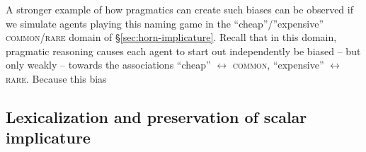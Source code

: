 \documentclass{article} %
\begin{document}
A stronger example of how pragmatics can create such biases can be observed if we simulate agents playing this naming game in the ``cheap''/''expensive'' \textsc{common}/\textsc{rare} domain of \S\ref{sec:horn-implicature}. Recall that in this domain, pragmatic reasoning causes each agent to start out independently be biased -- but only weakly -- towards the associations ``cheap'' $\leftrightarrow$ \textsc{common}, ``expensive'' $\leftrightarrow$ \textsc{rare}. Because this bias 

%




\subsection{Lexicalization and preservation of scalar implicature}
\end{document}
